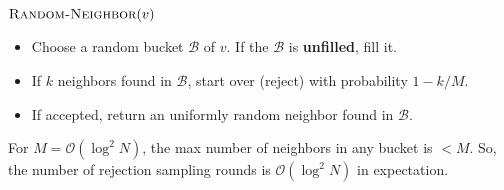 \begin{alertblock}{$\textsc{Random-Neighbor}(v)$}
\begin{itemize}
    \item Choose a random bucket $\mathcal B$ of $v$. If the $\mathcal B$ is \textbf{unfilled}, fill it.
    \item If $k$ neighbors found in $\mathcal B$, start over (reject) with probability $1-k/M$.
    \item If accepted, return an uniformly random neighbor found in $\mathcal B$.
\end{itemize}
For $M = \mathcal O(\log^2 N)$, the max number of neighbors in any bucket is $<M$.
So, the number of rejection sampling rounds is $\mathcal O(\log^2 N)$ in expectation.
\end{alertblock}






